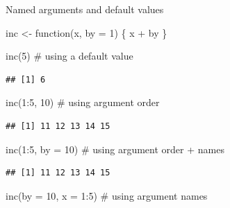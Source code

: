 \documentclass[
  9pt,
  ignorenonframetext,
]{beamer}
\newenvironment{Shaded}{\begin{snugshade}}{\end{snugshade}}
\newcommand{\CommentTok}[1]{\textcolor[rgb]{0.50,0.62,0.50}{#1}}
\newcommand{\ControlFlowTok}[1]{\textcolor[rgb]{0.94,0.87,0.69}{#1}}
\newcommand{\DataTypeTok}[1]{\textcolor[rgb]{0.87,0.87,0.75}{#1}}
\newcommand{\DecValTok}[1]{\textcolor[rgb]{0.86,0.86,0.80}{#1}}
\newcommand{\KeywordTok}[1]{\textcolor[rgb]{0.94,0.87,0.69}{#1}}
\newcommand{\NormalTok}[1]{\textcolor[rgb]{0.80,0.80,0.80}{#1}}
\newcommand{\OperatorTok}[1]{\textcolor[rgb]{0.94,0.94,0.82}{#1}}
\newcommand{\StringTok}[1]{\textcolor[rgb]{0.80,0.58,0.58}{#1}}
\begin{document}
\begin{frame}[fragile]{Named arguments and default values}
\protect\hypertarget{named-arguments-and-default-values}{}
\small

\begin{Shaded}
\begin{Highlighting}[]
\NormalTok{inc \textless{}{-}}\StringTok{ }\ControlFlowTok{function}\NormalTok{(x, }\DataTypeTok{by =} \DecValTok{1}\NormalTok{) \{ x }\OperatorTok{+}\StringTok{ }\NormalTok{by \} }

\KeywordTok{inc}\NormalTok{(}\DecValTok{5}\NormalTok{)          }\CommentTok{\# using a default value}
\end{Highlighting}
\end{Shaded}

\begin{verbatim}
## [1] 6
\end{verbatim}

\begin{Shaded}
\begin{Highlighting}[]
\KeywordTok{inc}\NormalTok{(}\DecValTok{1}\OperatorTok{:}\DecValTok{5}\NormalTok{, }\DecValTok{10}\NormalTok{)        }\CommentTok{\# using argument order}
\end{Highlighting}
\end{Shaded}

\begin{verbatim}
## [1] 11 12 13 14 15
\end{verbatim}

\begin{Shaded}
\begin{Highlighting}[]
\KeywordTok{inc}\NormalTok{(}\DecValTok{1}\OperatorTok{:}\DecValTok{5}\NormalTok{, }\DataTypeTok{by =} \DecValTok{10}\NormalTok{)       }\CommentTok{\# using argument order + names}
\end{Highlighting}
\end{Shaded}

\begin{verbatim}
## [1] 11 12 13 14 15
\end{verbatim}

\begin{Shaded}
\begin{Highlighting}[]
\KeywordTok{inc}\NormalTok{(}\DataTypeTok{by =} \DecValTok{10}\NormalTok{, }\DataTypeTok{x =} \DecValTok{1}\OperatorTok{:}\DecValTok{5}\NormalTok{)   }\CommentTok{\# using argument names}
\end{Highlighting}
\end{Shaded}


\end{frame}
\end{document}

